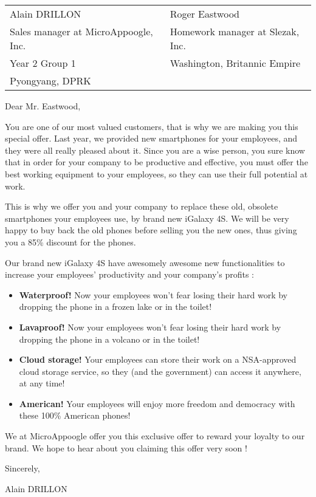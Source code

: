 \documentclass[11pt]{article}
\begin{document}
    \thispagestyle{empty}
    \begin{tabular}{p{10cm}p{10cm}}
        Alain DRILLON & Roger Eastwood \\
        Sales manager at MicroAppoogle, Inc. & Homework manager at Slezak, Inc. \\
        Year 2 Group 1 & Washington, Britannic Empire \\
        Pyongyang, DPRK & \\
    \end{tabular}

    \vspace{3cm}

    Dear Mr. Eastwood,
    \vspace{0.5cm}

    You are one of our most valued customers, that is why we are making you this special offer. Last year, we provided new smartphones for your employees, and they were all really pleased about it. Since you are a wise person, you sure know that in order for your company to be productive and effective, you must offer the best working equipment to your employees, so they can use their full potential at work.

    This is why we offer you and your company to replace these old, obsolete smartphones your employees use, by brand new iGalaxy 4S. We will be very happy to buy back the old phones before selling you the new ones, thus giving you a 85\% discount for the phones.

    Our brand new iGalaxy 4S have awesomely awesome new functionalities to increase your employees' productivity and your company's profits :
    \begin{itemize}
        \item \textbf{Waterproof!} Now your employees won't fear losing their hard work by dropping the phone in a frozen lake or in the toilet!
        \item \textbf{Lavaproof!} Now your employees won't fear losing their hard work by dropping the phone in a volcano or in the toilet!
        \item \textbf{Cloud storage!} Your employees can store their work on a NSA-approved cloud storage service, so they (and the government) can access it anywhere, at any time!
        \item \textbf{American!} Your employees will enjoy more freedom and democracy with these 100\% American phones!
    \end{itemize}

    We at MicroAppoogle offer you this exclusive offer to reward your loyalty to our brand. We hope to hear about you claiming this offer very soon !

    \vspace{0.5cm}
    Sincerely,

    Alain DRILLON
\end{document}
